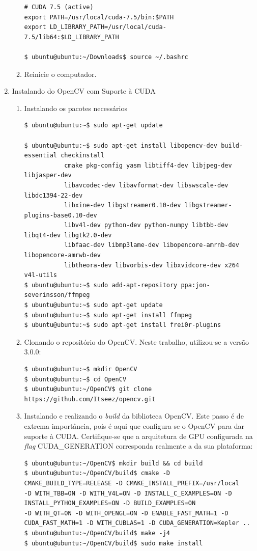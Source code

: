 \begin{enumerate}
\begin{enumerate}
\begin{lstlisting}[basicstyle=\tiny]
# CUDA 7.5 (active)
export PATH=/usr/local/cuda-7.5/bin:$PATH
export LD_LIBRARY_PATH=/usr/local/cuda-7.5/lib64:$LD_LIBRARY_PATH

$ ubuntu@ubuntu:~/Downloads$ source ~/.bashrc
\end{lstlisting}

\item Reinicie o computador.
 \end{enumerate}

  \item Instalando do OpenCV com Suporte à CUDA \cite{Harasimowicz2015}
  \begin{enumerate}
   \item Instalando os pacotes necessários
   \begin{lstlisting}[basicstyle=\tiny]
$ ubuntu@ubuntu:~$ sudo apt-get update

$ ubuntu@ubuntu:~$ sudo apt-get install libopencv-dev build-essential checkinstall 
		   cmake pkg-config yasm libtiff4-dev libjpeg-dev libjasper-dev 
		   libavcodec-dev libavformat-dev libswscale-dev libdc1394-22-dev 
		   libxine-dev libgstreamer0.10-dev libgstreamer-plugins-base0.10-dev 
		   libv4l-dev python-dev python-numpy libtbb-dev libqt4-dev libgtk2.0-dev 
		   libfaac-dev libmp3lame-dev libopencore-amrnb-dev libopencore-amrwb-dev 
		   libtheora-dev libvorbis-dev libxvidcore-dev x264 v4l-utils
$ ubuntu@ubuntu:~$ sudo add-apt-repository ppa:jon-severinsson/ffmpeg  
$ ubuntu@ubuntu:~$ sudo apt-get update  
$ ubuntu@ubuntu:~$ sudo apt-get install ffmpeg  
$ ubuntu@ubuntu:~$ sudo apt-get install frei0r-plugins
   \end{lstlisting}

   \item Clonando o repositório do OpenCV. Neste trabalho, utilizou-se a versão 3.0.0:
   \begin{lstlisting}[basicstyle=\tiny]
$ ubuntu@ubuntu:~$ mkdir OpenCV  
$ ubuntu@ubuntu:~$ cd OpenCV
$ ubuntu@ubuntu:~/OpenCV$ git clone https://github.com/Itseez/opencv.git  
   \end{lstlisting}


   \item Instalando e realizando o \textit{build} da biblioteca OpenCV. Este passo é de extrema importância, pois é aqui que configura-se o OpenCV para dar suporte à CUDA. Certifique-se que a arquitetura de GPU configurada na \textit{flag} CUDA\_GENERATION corresponda realmente a da sua plataforma:
   \begin{lstlisting}[basicstyle=\tiny]
$ ubuntu@ubuntu:~/OpenCV$ mkdir build && cd build
$ ubuntu@ubuntu:~/OpenCV/build$ cmake -D CMAKE_BUILD_TYPE=RELEASE -D CMAKE_INSTALL_PREFIX=/usr/local 
-D WITH_TBB=ON -D WITH_V4L=ON -D INSTALL_C_EXAMPLES=ON -D INSTALL_PYTHON_EXAMPLES=ON -D BUILD_EXAMPLES=ON 
-D WITH_QT=ON -D WITH_OPENGL=ON -D ENABLE_FAST_MATH=1 -D CUDA_FAST_MATH=1 -D WITH_CUBLAS=1 -D CUDA_GENERATION=Kepler ..
$ ubuntu@ubuntu:~/OpenCV/build$ make -j4
$ ubuntu@ubuntu:~/OpenCV/build$ sudo make install
    \end{lstlisting}


\end{enumerate}
\end{enumerate}
